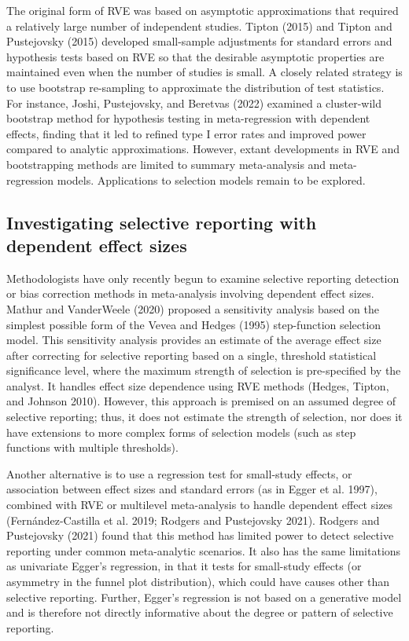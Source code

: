 \documentclass[
]{article}
\begin{document}
The original form of RVE was based on asymptotic approximations that
required a relatively large number of independent studies. Tipton (2015)
and Tipton and Pustejovsky (2015) developed small-sample adjustments for
standard errors and hypothesis tests based on RVE so that the desirable
asymptotic properties are maintained even when the number of studies is
small. A closely related strategy is to use bootstrap re-sampling to
approximate the distribution of test statistics. For instance, Joshi,
Pustejovsky, and Beretvas (2022) examined a cluster-wild bootstrap
method for hypothesis testing in meta-regression with dependent effects,
finding that it led to refined type I error rates and improved power
compared to analytic approximations. However, extant developments in RVE
and bootstrapping methods are limited to summary meta-analysis and
meta-regression models. Applications to selection models remain to be
explored.

\subsection{Investigating selective reporting with dependent effect
sizes}\label{investigating-selective-reporting-with-dependent-effect-sizes}

Methodologists have only recently begun to examine selective reporting
detection or bias correction methods in meta-analysis involving
dependent effect sizes. Mathur and VanderWeele (2020) proposed a
sensitivity analysis based on the simplest possible form of the Vevea
and Hedges (1995) step-function selection model. This sensitivity
analysis provides an estimate of the average effect size after
correcting for selective reporting based on a single, threshold
statistical significance level, where the maximum strength of selection
is pre-specified by the analyst. It handles effect size dependence using
RVE methods (Hedges, Tipton, and Johnson 2010). However, this approach
is premised on an assumed degree of selective reporting; thus, it does
not estimate the strength of selection, nor does it have extensions to
more complex forms of selection models (such as step functions with
multiple thresholds).

Another alternative is to use a regression test for small-study effects,
or association between effect sizes and standard errors (as in Egger et
al. 1997), combined with RVE or multilevel meta-analysis to handle
dependent effect sizes (Fernández-Castilla et al. 2019; Rodgers and
Pustejovsky 2021). Rodgers and Pustejovsky (2021) found that this method
has limited power to detect selective reporting under common
meta-analytic scenarios. It also has the same limitations as univariate
Egger's regression, in that it tests for small-study effects (or
asymmetry in the funnel plot distribution), which could have causes
other than selective reporting. Further, Egger's regression is not based
on a generative model and is therefore not directly informative about
the degree or pattern of selective reporting.
\end{document}
